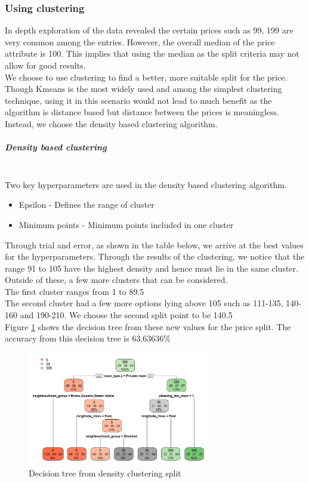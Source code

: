 \documentclass{sig-alternate}
\begin{document}
	\subsubsection{Using clustering}
	In depth exploration of the data revealed the certain prices such as 99, 199 are very common among the entries. However, the overall median of the price attribute is 100. This implies that using the median as the split criteria may not allow for good results.\\
	We choose to use clustering to find a better, more suitable split for the price. \\
	Though Kmeans is the most widely used and among the simplest clustering technique, using it in this scenario would not lead to much benefit as the algorithm is distance based but distance between the prices is meaningless.\\
	Instead, we choose the density based clustering algorithm.
	\subparagraph{\textbf{Density based clustering}}\\
	Two key hyperparameters are used in the density based clustering algorithm.\\
	\begin{itemize}
		\item Epsilon - Defines the range of cluster
		\item Minimum points - Minimum points included in one cluster
	\end{itemize}
	Through trial and error, as shown in the table below, we arrive at the best values for the hyperparameters.
	Through the results of the clustering, we notice that the range 91 to 105 have the highest density and hence must lie in the same cluster. Outside of these, a few more clusters that can be considered.\\
	The first cluster ranges from 1 to 89.5\\
	The second cluster had a few more options lying above 105 such as 111-135, 140-160 and 190-210. We choose the second split point to be 140.5\\
	Figure \ref{decision6} shows the decision tree from these new values for the price split. The accuracy from this decision tree is 63.63636\%\\
	\begin{figure}[ht]
		\includegraphics[width=8cm]{decision6.png}
		\caption{Decision tree from density clustering split}
		\label{decision6}
		\centering
	\end{figure}
\end{document}
